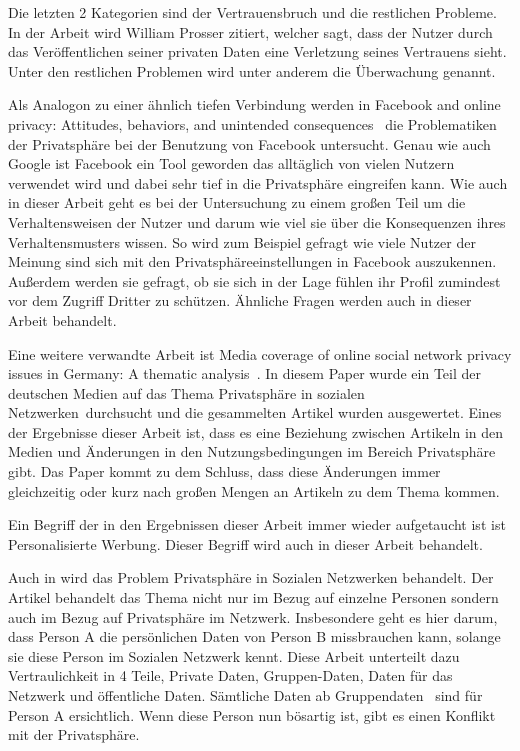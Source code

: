 Die letzten 2 Kategorien sind der Vertrauensbruch und die restlichen Probleme. In der Arbeit wird William Prosser zitiert, welcher sagt, dass der Nutzer durch das Veröffentlichen seiner privaten Daten eine Verletzung seines Vertrauens sieht. Unter den restlichen Problemen wird unter anderem die Überwachung genannt.

Als Analogon zu einer ähnlich tiefen Verbindung werden in \glqq Facebook and online privacy: Attitudes, behaviors, and unintended consequences\grqq\ \citet{debatin2009facebook} die Problematiken der Privatsphäre bei der Benutzung von Facebook untersucht. Genau wie auch Google ist Facebook ein Tool geworden das alltäglich von vielen Nutzern verwendet wird und dabei sehr tief in die Privatsphäre eingreifen kann. Wie auch in dieser Arbeit geht es bei der Untersuchung zu einem großen Teil um die Verhaltensweisen der Nutzer und darum wie viel sie über die Konsequenzen ihres Verhaltensmusters wissen. So wird zum Beispiel gefragt wie viele Nutzer der Meinung sind sich mit den Privatsphäreeinstellungen in Facebook auszukennen. Außerdem werden sie gefragt, ob sie sich in der Lage fühlen ihr Profil zumindest vor dem Zugriff Dritter zu schützen. Ähnliche Fragen werden auch in dieser Arbeit behandelt.

Eine weitere verwandte Arbeit ist \glqq Media coverage of online social network privacy issues in Germany: A thematic analysis\grqq\ \citet{rizk2009media}. In diesem Paper wurde ein Teil der deutschen Medien auf das Thema \glqq Privatsphäre in sozialen Netzwerken\grqq\ durchsucht und die gesammelten Artikel wurden ausgewertet. Eines der Ergebnisse dieser Arbeit ist, dass es eine Beziehung zwischen Artikeln in den Medien und Änderungen in den Nutzungsbedingungen im Bereich Privatsphäre gibt. Das Paper kommt zu dem Schluss, dass diese Änderungen immer gleichzeitig oder kurz nach großen Mengen an Artikeln zu dem Thema kommen.

Ein Begriff der in den Ergebnissen dieser Arbeit immer wieder aufgetaucht ist ist \glqq Personalisierte Werbung\grqq . Dieser Begriff wird auch in dieser Arbeit behandelt.

Auch in \citet{Preibusch2007Ubiquitous} wird das Problem Privatsphäre in Sozialen Netzwerken behandelt. Der Artikel behandelt das Thema nicht nur im Bezug auf einzelne Personen sondern auch im Bezug auf Privatsphäre im Netzwerk. Insbesondere geht es hier darum, dass Person A die persönlichen Daten von Person B missbrauchen kann, solange sie diese Person im Sozialen Netzwerk kennt. Diese Arbeit unterteilt dazu Vertraulichkeit in 4 Teile, Private Daten, Gruppen-Daten, Daten für das Netzwerk und öffentliche Daten. Sämtliche Daten ab \glqq Gruppendaten \grqq\ sind für Person A ersichtlich. Wenn diese Person nun bösartig ist, gibt es einen Konflikt mit der Privatsphäre. 

